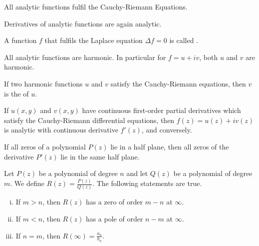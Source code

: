\begin{lemma}
    All analytic functions fulfil the Cauchy-Riemann Equations.
\end{lemma}

\begin{theorem}
    Derivatives of analytic functions are again analytic.
\end{theorem}

\begin{definition}[Harmonic]
    A function $f$ that fulfils the Laplace equation $\Delta f = 0$ is called
    .
\end{definition}

\begin{theorem}
    All analytic functions are harmonic. In particular
    for $f = u + i v$, both $u$ and $v$ are harmonic.
\end{theorem}

\begin{definition}
    If two harmonic functions $u$ and $v$ satisfy the Cauchy-Riemann equations,
    then $v$ is the  of $u$.
\end{definition}

\begin{theorem}
    If $u(x,y)$ and $v(x,y)$ have continuous first-order partial derivatives which
    satisfy the Cauchy-Riemann differential equations, then $f(z) = u(z) + i v(z)$
    is analytic with continuous derivative $f'(z)$, and conversely.
\end{theorem}

\begin{theorem}
    If all zeros of a polynomial $P(z)$ lie in a half plane, then all
    zeros of the derivative $P'(z)$ lie in the same half plane.
\end{theorem}

\begin{theorem}
    Let $P(z)$ be a polynomial of degree $n$ and let $Q(z)$ be a polynomial of degree
    $m$. We define $R(z) = \frac{P(z)}{Q(z)}$. The following statements are true.
    \begin{enumerate}[(i)]
        \item If $m>n$, then $R(z)$ has a zero of order $m-n$ at $\infty$.
        \item If $m<n$, then $R(z)$ has a pole of order $n-m$ at $\infty$.
        \item If $n=m$, then $R(\infty) = \frac{a_n}{b_n}$.
    \end{enumerate}
\end{theorem}
